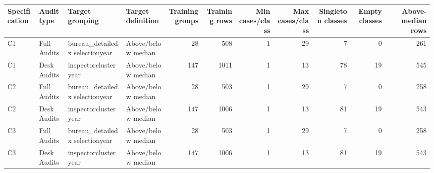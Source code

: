 \begin{tabular}[t]{llllrrrrrrr}
\toprule
Specification & Audit type & Target grouping & Target definition & Training groups & Training rows & Min cases/class & Max cases/class & Singleton classes & Empty classes & Above-median rows\\
\midrule
C1 & Full Audits & bureau\_detailed x selectionyear & Above/below median & 28 & 508 & 1 & 29 & 7 & 0 & 261\\
C1 & Desk Audits & inspectorclusteryear & Above/below median & 147 & 1011 & 1 & 13 & 78 & 19 & 545\\
C2 & Full Audits & bureau\_detailed x selectionyear & Above/below median & 28 & 503 & 1 & 29 & 7 & 0 & 258\\
C2 & Desk Audits & inspectorclusteryear & Above/below median & 147 & 1006 & 1 & 13 & 81 & 19 & 543\\
C3 & Full Audits & bureau\_detailed x selectionyear & Above/below median & 28 & 503 & 1 & 29 & 7 & 0 & 258\\
C3 & Desk Audits & inspectorclusteryear & Above/below median & 147 & 1006 & 1 & 13 & 81 & 19 & 543\\
\bottomrule
\end{tabular}
